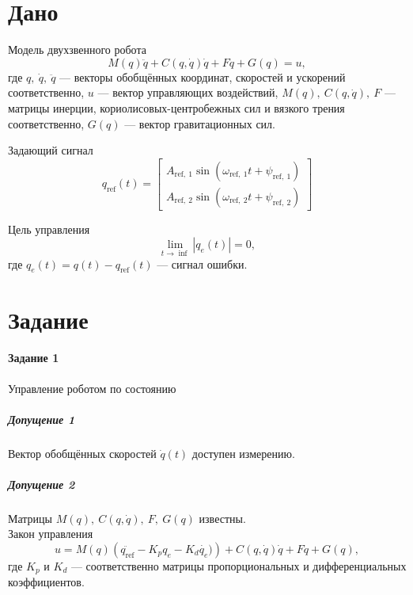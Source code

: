 \documentclass[14pt]{extarticle}
\begin{document}
    

    \section*{Дано}
    Модель двухзвенного робота
    \begin{equation}
        \label{eq:sys}
        M(q)\ddot{q} + C(q, \dot{q})\dot{q} + F\dot{q} +G(q) = u,
    \end{equation}
    где $q,\ \dot{q},\ \ddot{q}$ --- векторы обобщённых координат, скоростей и ускорений соответственно,
    $u$ --- вектор управляющих воздействий,
    $M(q),\ C(q,\dot{q}),\ F$ --- матрицы инерции, кориолисовых-центробежных сил и вязкого трения соответственно,
    $G(q)$ --- вектор гравитационных сил.
    \newline

    Задающий сигнал
    \begin{equation}
        \label{eq:traject}
        q_{\text{ref}}(t) =
        \begin{bmatrix}
            A_{\text{ref},\ 1}\sin(\omega_{\text{ref},\ 1}t + \psi_{\text{ref},\ 1})\\
            A_{\text{ref},\ 2}\sin(\omega_{\text{ref},\ 2}t + \psi_{\text{ref},\ 2})
        \end{bmatrix}
    \end{equation}

    Цель управления
    \begin{equation}
        \label{eq:goal}
        \lim_{t \rightarrow \inf }\left| q_e(t) \right| = 0,
    \end{equation}
    где $q_e(t) = q(t) - q_\text{ref}(t)$ --- сигнал ошибки.

    \section*{Задание}
    \paragraph*{Задание 1} Управление роботом по состоянию

    \subparagraph{Допущение 1} Вектор обобщённых скоростей $\dot{q}(t)$ доступен измерению.

    \subparagraph{Допущение 2} Матрицы $M(q),\ C(q, \dot{q}),\ F,\ G(q)$ известны. \\

    \noindent Закон управления
    \begin{equation}
        \label{eq:control by speed}
        u = M(q)\left( \ddot{q_\text{ref}} - K_p q_e - K_d\dot{q_e}) \right) + C(q, \dot{q})\dot{q} + F\dot{q} + G(q),
    \end{equation}
    где $K_p$ и $K_d$ --- соответственно матрицы пропорциональных и дифференциальных коэффициентов.
    \newline
\end{document}
